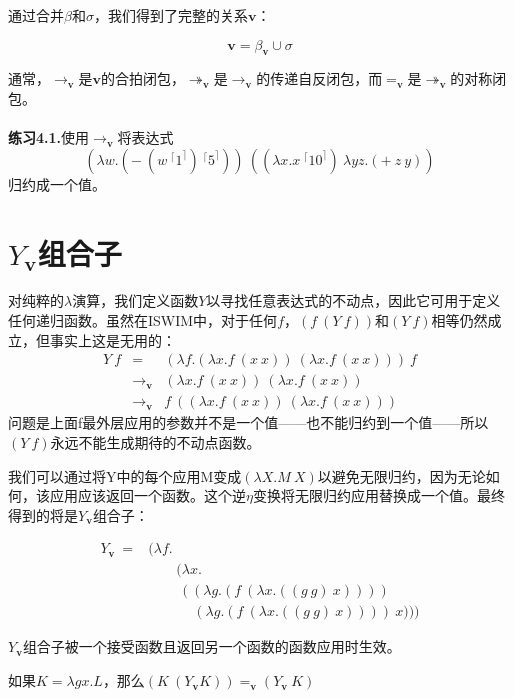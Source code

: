 \documentclass{book}
\def\v{\mathbf{v}}
\def\lianxi{\noindent \makebox[0pt][r]{$\rhd$} \textbf}
\begin{document}
通过合并$\beta$和$\sigma$，我们得到了完整的关系$\mathbf{v}$：
\begin{framed}
 $$
 \mathbf{v} = \beta_{\mathbf{v}} \cup \sigma
 $$
\end{framed}
通常，$\rightarrow_{\mathbf{v}}$是$\mathbf{v}$的合拍闭包，$\twoheadrightarrow_{\mathbf{v}}$是$\rightarrow_{\mathbf{v}}$的传递自反闭包，而$=_{\mathbf{v}}$是$\twoheadrightarrow_{\mathbf{v}}$的对称闭包。\\\\
\lianxi{练习4.1.}使用$\rightarrow_\v$将表达式$$(\lambda w.(-\ (w\ ^\lceil 1^\rceil)\ ^\lceil 5^\rceil))\ ((\lambda x.x\ ^\lceil 10^\rceil)\ \lambda yz.(+\ z\ y))$$归约成一个值。
\section{$Y_{\mathbf{v}}$组合子}
对纯粹的$\lambda$演算，我们定义函数$Y$以寻找任意表达式的不动点，因此它可用于定义任何递归函数。虽然在ISWIM中，对于任何$f$，$(f\ (Y\ f))$和$(Y\ f)$相等仍然成立，但事实上这是无用的：
$$
\begin{array}{ccl}
 Y\ f & = & (\lambda f.(\lambda x.f\ (x\ x))\ (\lambda x.f\ (x\ x)))\ f\\
    & \rightarrow_{\mathbf{v}} & (\lambda x.f\ (x\ x))\ (\lambda x.f\ (x\ x))\\
    & \rightarrow_{\mathbf{v}} & f\ ((\lambda x.f\ (x\ x))\ (\lambda x.f\ (x\ x)))
\end{array}
$$
问题是上面f最外层应用的参数并不是一个值——也不能归约到一个值——所以$(Y\ f)$永远不能生成期待的不动点函数。\par
我们可以通过将Y中的每个应用M变成$(\lambda X.M\ X)$以避免无限归约，因为无论如何，该应用应该返回一个函数。这个逆$\eta$变换将无限归约应用替换成一个值。最终得到的将是$Y_{\mathbf{v}}$组合子：
\begin{framed}
 $$
 \begin{array}{ll}
  Y_{\mathbf{v}}\ = & (\lambda f.\\
  & \qquad (\lambda x.\\
  & \qquad\ \ (\ (\lambda g.(f\ (\lambda x.((g\ g)\ x))))\\
  & \qquad\quad\  (\lambda g.(f\ (\lambda x.((g\ g)\ x))))\ x)))
 \end{array}
 $$
\end{framed}
$Y_{\mathbf{v}}$组合子被一个接受函数且返回另一个函数的函数应用时生效。
\begin{Theorem}
 如果$K=\lambda gx.L$，那么$(K\ (Y_{\mathbf{v}} K))=_{\mathbf{v}}(Y_{\mathbf{v}}\ K)$
\end{Theorem}
\end{document}
